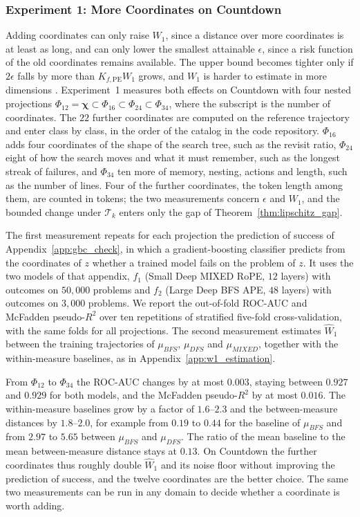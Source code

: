 \subsubsection{Experiment 1: More Coordinates on Countdown}
\label{app:refine}

Adding coordinates can only raise $W_1$, since a distance over more coordinates is at least as long, and can only lower the smallest attainable $\epsilon$, since a risk function of the old coordinates remains available. The upper bound becomes tighter only if $2\epsilon$ falls by more than $K_{f,\mathrm{PE}}W_1$ grows, and $W_1$ is harder to estimate in more dimensions \citep{weed2019sharp}. Experiment~1 measures both effects on Countdown with four nested projections $\Phi_{12}=\boldsymbol\chi\subset\Phi_{16}\subset\Phi_{24}\subset\Phi_{34}$, where the subscript is the number of coordinates. The $22$ further coordinates are computed on the reference trajectory and enter class by class, in the order of the catalog in the code repository. $\Phi_{16}$ adds four coordinates of the shape of the search tree, such as the revisit ratio, $\Phi_{24}$ eight of how the search moves and what it must remember, such as the longest streak of failures, and $\Phi_{34}$ ten more of memory, nesting, actions and length, such as the number of lines. Four of the further coordinates, the token length among them, are counted in tokens; the two measurements concern $\epsilon$ and $W_1$, and the bounded change under $\mathcal T_k$ enters only the gap of Theorem~\ref{thm:lipschitz_gap}.

The first measurement repeats for each projection the prediction of success of Appendix~\ref{app:gbc_check}, in which a gradient-boosting classifier predicts from the coordinates of $z$ whether a trained model fails on the problem of $z$. It uses the two models of that appendix, $f_1$ (Small Deep MIXED RoPE, $12$ layers) with outcomes on $50{,}000$ problems and $f_2$ (Large Deep BFS APE, $48$ layers) with outcomes on $3{,}000$ problems. We report the out-of-fold ROC-AUC and McFadden pseudo-$R^2$ over ten repetitions of stratified five-fold cross-validation, with the same folds for all projections. The second measurement estimates $\widehat W_1$ between the training trajectories of $\mu_{BFS}$, $\mu_{DFS}$ and $\mu_{MIXED}$, together with the within-measure baselines, as in Appendix~\ref{app:w1_estimation}.

From $\Phi_{12}$ to $\Phi_{34}$ the ROC-AUC changes by at most $0.003$, staying between $0.927$ and $0.929$ for both models, and the McFadden pseudo-$R^2$ by at most $0.016$. The within-measure baselines grow by a factor of $1.6$--$2.3$ and the between-measure distances by $1.8$--$2.0$, for example from $0.19$ to $0.44$ for the baseline of $\mu_{BFS}$ and from $2.97$ to $5.65$ between $\mu_{BFS}$ and $\mu_{DFS}$. The ratio of the mean baseline to the mean between-measure distance stays at $0.13$. On Countdown the further coordinates thus roughly double $\widehat W_1$ and its noise floor without improving the prediction of success, and the twelve coordinates are the better choice. The same two measurements can be run in any domain to decide whether a coordinate is worth adding.

